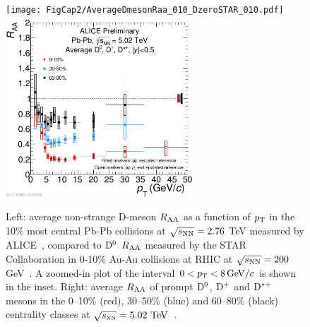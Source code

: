 \begin{figure}[!ht]
  \centering
    \texttt{[image: FigCap2/AverageDmesonRaa\_010\_DzeroSTAR\_010.pdf]}
    \includegraphics[width=7cm]{FigCap2/2017-Jul-05-DmesonAverage_010_3050_6080_comparison_04July2017.pdf}
  \caption{Left: average non-strange D-meson $R_{\rm AA}$ as a function of $p_{\rm T}$ in the 10\% most central Pb-Pb collisions at
 $\sqrt{s_{\rm NN}}=2.76$ TeV measured by ALICE~\cite{Adam:2015sza}, compared to ${\rm D^0}$ $R_{\rm AA}$ measured by the STAR Collaboration in 0-10\% Au-Au collisions at RHIC at
$\sqrt{s_{\rm NN}}=200$ GeV~\cite{Adamczyk:2014uip}. A zoomed-in plot of the interval $0 < p_{\rm T} < 8\, \mathrm{GeV}/c$ is shown in the inset. Right: average $R_{\rm AA}$ 
  of prompt ${\rm D^0}$, ${\rm D^+}$ and ${\rm D^{*+}}$ mesons in the 0--10\% (red), 30--50\% (blue) and 60--80\% (black) centrality classes at $\sqrt{s_{\rm \scriptscriptstyle NN}}=5.02~\mathrm{TeV}$~\cite{ALICE-PUBLIC-2017-003}.  }
  \label{fig:Raa}
\end{figure}

